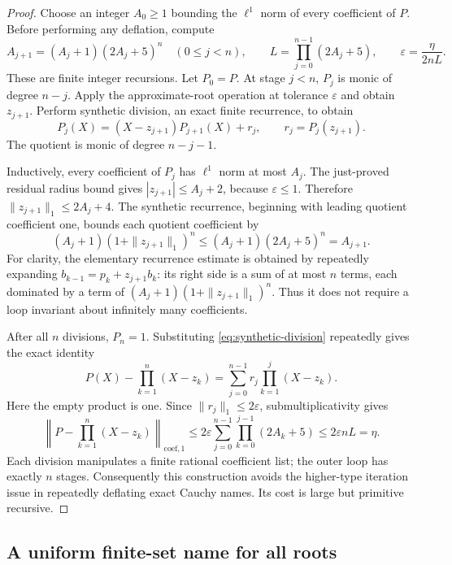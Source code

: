 \begin{proof}
Choose an integer \(A_0\ge1\) bounding the \(\ell^1\) norm of every
coefficient of \(P\). Before performing any deflation, compute
\[
 A_{j+1}=(A_j+1)(2A_j+5)^n\quad(0\le j<n),\qquad
 L=\prod_{j=0}^{n-1}(2A_j+5),\qquad
 \varepsilon=\frac{\eta}{2nL}.
 \tag{AF}\label{eq:factor-budget}
\]
These are finite integer recursions. Let \(P_0=P\). At stage \(j<n\),
\(P_j\) is monic of degree \(n-j\). Apply the approximate-root
operation at tolerance \(\varepsilon\) and obtain \(z_{j+1}\). Perform
synthetic division, an exact finite recurrence, to obtain
\[
 P_j(X)=(X-z_{j+1})P_{j+1}(X)+r_j,
 \qquad r_j=P_j(z_{j+1}).
 \tag{SD}\label{eq:synthetic-division}
\]
The quotient is monic of degree \(n-j-1\).

Inductively, every coefficient of \(P_j\) has \(\ell^1\) norm at most
\(A_j\). The just-proved residual radius bound gives
\(|z_{j+1}|\le A_j+2\), because \(\varepsilon\le1\). Therefore
\(\|z_{j+1}\|_1\le2A_j+4\). The synthetic recurrence, beginning with
leading quotient coefficient one, bounds each quotient coefficient by
\[
 (A_j+1)(1+\|z_{j+1}\|_1)^n
 \le (A_j+1)(2A_j+5)^n=A_{j+1}.
\]
For clarity, the elementary recurrence estimate is obtained by repeatedly
expanding \(b_{k-1}=p_k+z_{j+1}b_k\): its right side is a sum of at
most \(n\) terms, each dominated by a term of
\((A_j+1)(1+\|z_{j+1}\|_1)^n\). Thus it does not require a loop
invariant about infinitely many coefficients.

After all \(n\) divisions, \(P_n=1\). Substituting
\eqref{eq:synthetic-division} repeatedly gives the exact identity
\[
 P(X)-\prod_{k=1}^n(X-z_k)
   =\sum_{j=0}^{n-1}r_j\prod_{k=1}^{j}(X-z_k).
 \tag{TE}\label{eq:factor-telescoping}
\]
Here the empty product is one. Since \(\|r_j\|_1\le2\varepsilon\),
submultiplicativity gives
\[
 \left\|P-\prod_{k=1}^n(X-z_k)\right\|_{\mathrm{coef},1}
 \le 2\varepsilon\sum_{j=0}^{n-1}
       \prod_{k=0}^{j-1}(2A_k+5)
 \le2\varepsilon nL=\eta.
\]
Each division manipulates a finite rational coefficient list; the outer
loop has exactly \(n\) stages. Consequently this construction avoids the
higher-type iteration issue in repeatedly deflating exact Cauchy names.
Its cost is large but primitive recursive.
\end{proof}

\subsection{A uniform finite-set name for all roots}

